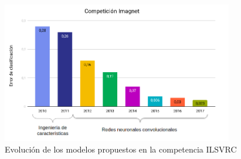 \begin{figure}
	\centering
	\includegraphics[width=0.9\textwidth]{img/imgnet-grafico.png}
	\caption{Evolución de los modelos propuestos en la competencia ILSVRC}
	\label{fig:EvolucionILSVRC}
\end{figure}

